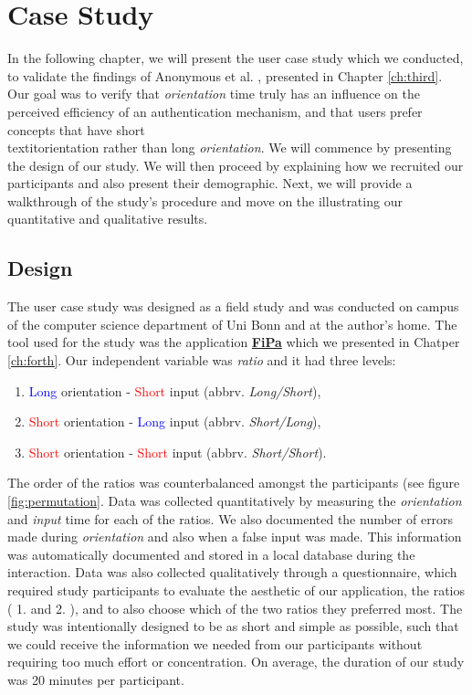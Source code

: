 
\chapter{Case Study}\label{ch:fifth}

In the following chapter, we will present the user case study which we conducted, to validate the findings of Anonymous et al. \cite{anonymous}, presented in Chapter \ref{ch:third}. Our goal was to verify that \textit{orientation} time truly has an influence on the perceived efficiency of an authentication mechanism, and that users prefer concepts that have short \\textit{orientation} rather than long \textit{orientation}. We will commence by presenting the design of our study. We will then proceed by explaining how we recruited our participants and also present their demographic. Next, we will provide a walkthrough of the study's procedure and move on the illustrating our quantitative and qualitative results.  

\section{Design} \label{5.1}

The user case study was designed as a field study and was conducted on campus of the computer science department of Uni Bonn and at the author's home. The tool used for the study was the application \underline{\textbf{FiPa}} which we presented in Chatper \ref{ch:forth}. Our independent variable was \textit{ratio} and it had three levels:
\begin{enumerate}
    \item \textcolor{blue}{Long} orientation - \textcolor{red}{Short} input (abbrv. \textit{Long/Short}), 
    \item \textcolor{red}{Short} orientation - \textcolor{blue}{Long} input (abbrv. \textit{Short/Long}), 
    \item \textcolor{red}{Short} orientation - \textcolor{red}{Short} input (abbrv. \textit{Short/Short}). 
\end{enumerate}

The order of the ratios was counterbalanced amongst the participants (see figure \ref{fig:permutation}. Data was collected quantitatively by measuring the \textit{orientation} and \textit{input} time for each of the ratios. We also documented the number of errors made during \textit{orientation} and also when a false input was made. This information was automatically documented and stored in a local database during the interaction. Data was also collected qualitatively through a questionnaire, which required study participants to evaluate the aesthetic of our application, the ratios ( 1. and 2. ), and to also choose which of the two ratios they preferred most. The study was intentionally designed to be as short and simple as possible, such that we could receive the information we needed from our participants without requiring too much effort or concentration. On average, the duration of our study was 20 minutes per participant. 

